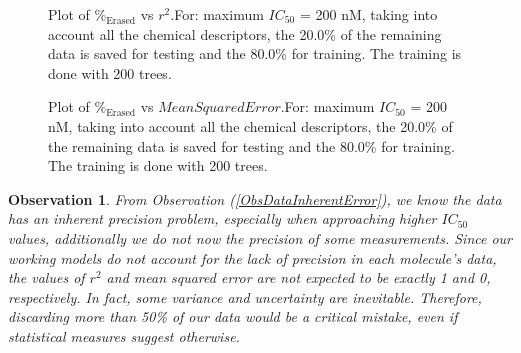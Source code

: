 \documentclass[12pt,letterpaper]{article}
\newtheorem{observation}{Observation}
\begin{document}
\begin{multicols}{2}
\begin{figure}[H]
\caption{Plot of $\%_{\text{Erased}}$ vs $r^2$.For: maximum $IC_{50}$ = 200 nM,  taking into account all the chemical descriptors, the 20.0\% of the remaining data is saved for testing and the  80.0\% for training. The training is done with 200 trees.}
\label{FigPlotErasedPercentageVSRSquare}
\end{figure}

\begin{figure}[H]
\caption{Plot of $\%_{\text{Erased}}$ vs $Mean Squared Error$.For: maximum $IC_{50}$ = 200 nM,  taking into account all the chemical descriptors, the 20.0\% of the remaining data is saved for testing and the  80.0\% for training. The training is done with 200 trees.}
\label{FigPlotErasedPercentageVSMeanSquaredError}
\end{figure}

\begin{observation}
From Observation (\ref{ObsDataInherentError}), we know the data has an inherent precision problem, especially when approaching higher  $IC_{50}$  values, additionally we do not now the precision of some measurements. Since our working models do not account for the lack of precision in each molecule’s data, the values of  $r^2$  and mean squared error are not expected to be exactly 1 and 0, respectively. In fact, some variance and uncertainty are inevitable. Therefore, discarding more than 50\% of our data would be a critical mistake, even if statistical measures suggest otherwise.


\end{observation}
\end{multicols}
\end{document}
